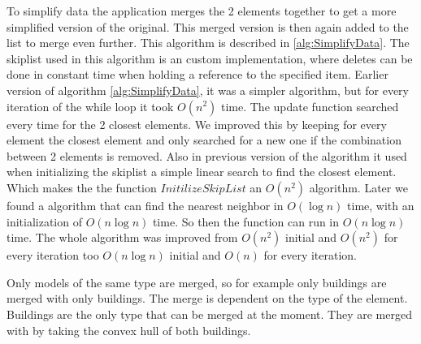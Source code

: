 To simplify data the application merges the 2 elements together to get a more simplified version of the original. This merged version is then again added to the list to merge even further. This algorithm is described in \ref{alg:SimplifyData}. The skiplist used in this algorithm is an custom implementation, where deletes can be done in constant time when holding a reference to the specified item. Earlier version of algorithm \ref{alg:SimplifyData}, it was a simpler algorithm, but for every iteration of the while loop it took $O(n^2)$ time. The update function searched every time for the 2 closest elements. We improved this by keeping for every element the closest element and only searched for a new one if the combination between 2 elements is removed. Also in previous version of the algorithm it used when initializing the skiplist a simple linear search to find the closest element. Which makes the the function $InitilizeSkipList$ an $O(n^2)$ algorithm. Later we found a algorithm that can find the nearest neighbor in $O(\log{n})$ time, with an initialization of $O(n\log{n})$ time. So then the function can run in $O(n\log{n})$ time. The whole algorithm was improved from $O(n^2)$ initial and $O(n^2)$ for every iteration too $O(n\log{n})$ initial and $O(n)$ for every iteration.

Only models of the same type are merged, so for example only buildings are merged with only buildings. The merge is dependent on the type of the element. Buildings are the only type that can be merged at the moment. They are merged with by taking the convex hull of both buildings.

